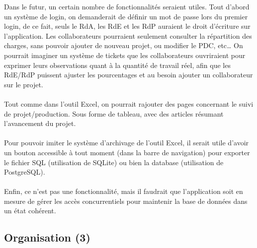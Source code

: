 \documentclass[french]{report}
\begin{document}
Dans le futur, un certain nombre de fonctionnalités seraient utiles. Tout
d’abord un système de login, on demanderait de définir un mot de passe lors du
premier login, de ce fait, seuls le RdA, les RdE et les RdP auraient le droit d’écriture
sur l’application. Les collaborateurs pourraient seulement consulter la
répartition des charges, sans pouvoir ajouter de nouveau projet, ou modifier le PDC, etc… On
pourrait imaginer un système de tickets que les collaborateurs ouvriraient pour
exprimer leurs observations quant à la quantité de travail réel, afin que les RdE/RdP
puissent ajuster les pourcentages et au besoin ajouter un collaborateur sur le
projet.\\\\ Tout comme dans l’outil Excel, on pourrait rajouter des pages
concernant le suivi de projet/production. Sous forme de tableau, avec des
articles résumant l’avancement du projet.\\\\ Pour pouvoir imiter le système
d’archivage de l’outil Excel, il serait utile d’avoir un bouton accessible à
tout moment (dans la barre de navigation) pour exporter le fichier SQL
(utilisation de SQLite) ou bien la database (utilisation de PostgreSQL).\\\\
Enfin, ce n’est pas une fonctionnalité, mais il faudrait que l’application soit
en mesure de gérer les accès concurrentiels pour maintenir la base de données
dans un état cohérent.

\subsection{Organisation (3)}
\end{document}
